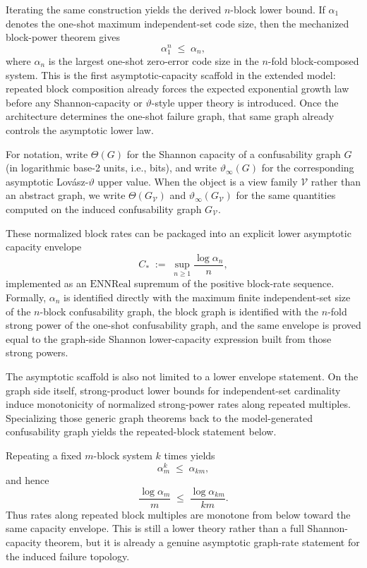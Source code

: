 Iterating the same construction yields the derived $n$-block lower bound. If $\alpha_1$ denotes the one-shot maximum independent-set code size, then the mechanized block-power theorem gives
\[
\alpha_1^n \;\le\; \alpha_n,
\]
where $\alpha_n$ is the largest one-shot zero-error code size in the $n$-fold block-composed system. This is the first asymptotic-capacity scaffold in the extended model: repeated block composition already forces the expected exponential growth law before any Shannon-capacity or $\vartheta$-style upper theory is introduced. Once the architecture determines the one-shot failure graph, that same graph already controls the asymptotic lower law.

For notation, write $\Theta(G)$ for the Shannon capacity of a confusability graph $G$ (in logarithmic base-2 units, i.e., bits), and write $\vartheta_\infty(G)$ for the corresponding asymptotic Lov\'asz-$\vartheta$ upper value. When the object is a view family $\mathcal V$ rather than an abstract graph, we write $\Theta(G_{\mathcal V})$ and $\vartheta_\infty(G_{\mathcal V})$ for the same quantities computed on the induced confusability graph $G_{\mathcal V}$.

These normalized block rates can be packaged into an explicit lower asymptotic capacity envelope
\[
C_* \;:=\; \sup_{n\ge 1} \frac{\log \alpha_n}{n},
\]
implemented as an $\mathrm{ENNReal}$ supremum of the positive block-rate sequence. Formally, $\alpha_n$ is identified directly with the maximum finite independent-set size of the $n$-block confusability graph, the block graph is identified with the $n$-fold strong power of the one-shot confusability graph, and the same envelope is proved equal to the graph-side Shannon lower-capacity expression built from those strong powers.

The asymptotic scaffold is also not limited to a lower envelope statement. On the graph side itself, strong-product lower bounds for independent-set cardinality induce monotonicity of normalized strong-power rates along repeated multiples. Specializing those generic graph theorems back to the model-generated confusability graph yields the repeated-block statement below.

Repeating a fixed $m$-block system $k$ times yields
\[
\alpha_m^k \;\le\; \alpha_{km},
\]
and hence
\[
\frac{\log \alpha_m}{m} \;\le\; \frac{\log \alpha_{km}}{km}.
\]
Thus rates along repeated block multiples are monotone from below toward the same capacity envelope. This is still a lower theory rather than a full Shannon-capacity theorem, but it is already a genuine asymptotic graph-rate statement for the induced failure topology.

